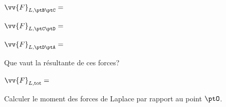 \begin{enonce}
$\vv{F}_{L,\ptB\ptC}=$
\end{enonce}


\begin{enonce}
$\vv{F}_{L,\ptC\ptD}=$
\end{enonce}


\begin{enonce}
$\vv{F}_{L,\ptD\ptA}=$
\end{enonce}


\pauseEntrainement


\bigskip
Que vaut la résultante de ces forces?
\minusMedskip

\repriseEntrainement



\begin{enonce}
$\vv{F}_{L,\text{tot}}=$
\end{enonce}



\pauseEntrainement

\bigskip
Calculer le moment des forces de Laplace par rapport au point $\ptO$. 
\minusMedskip


\repriseEntrainement


